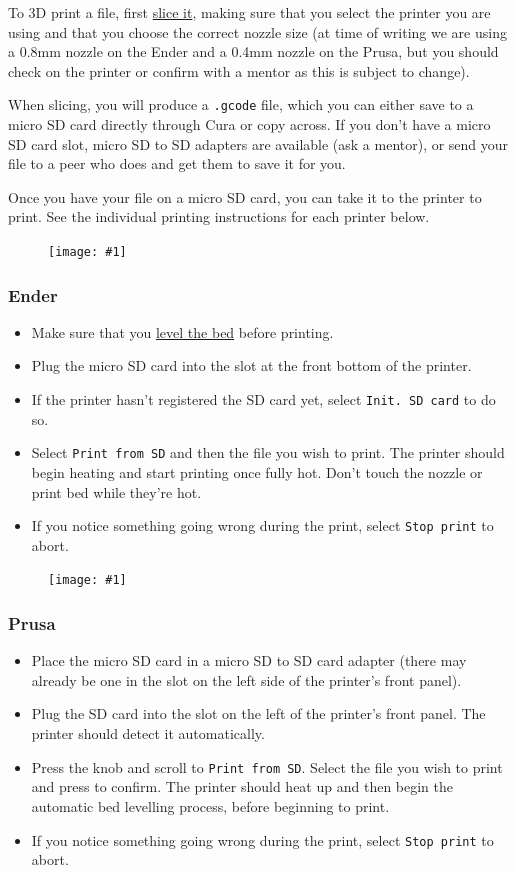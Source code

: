 \documentclass[12pt]{report}
\newcommand{\imageright}[2]{
    \begin{figure}
        \centering
        \texttt{[image: \#1]}
        \vspace*{-1cm}
    \end{figure}
}
\begin{document}
To 3D print a file, first \hyperref[sec:slicing]{slice it}, making sure that you
select the printer you are using and that you choose the correct nozzle size (at
time of writing we are using a 0.8mm nozzle on the Ender and a 0.4mm nozzle on
the Prusa, but you should check on the printer or confirm with a mentor as this
is subject to change). \par
When slicing, you will produce a \texttt{.gcode} file, which you can either save
to a micro SD card directly through Cura or copy across. If you don't have a
micro SD card slot, micro SD to SD adapters are available (ask a mentor), or
send your file to a peer who does and get them to save it for you. \par
Once you have your file on a micro SD card, you can take it to the printer to
print. See the individual printing instructions for each printer below. 

\imageright{ender.jpg}{.25}
\subsubsection*{Ender}

\begin{itemize}
    \item Make sure that you \hyperref[sec:levelling]{level the bed} before
        printing.
    \item Plug the micro SD card into the slot at the front bottom of the
        printer.
    \item If the printer hasn't registered the SD card yet, select
        \texttt{Init. SD card} to do so.
    \item Select \texttt{Print from SD} and then the file you wish to
        print. The printer should begin heating and start printing once fully
        hot. Don't touch the nozzle or print bed while they're hot.
    \item If you notice something going wrong during the print, select
        \texttt{Stop print} to abort.
\end{itemize}

\imageright{prusa.jpg}{.25}
\subsubsection*{Prusa}

\begin{itemize}
    \item Place the micro SD card in a micro SD to SD card adapter (there may
        already be one in the slot on the left side of the printer's front
        panel).
    \item Plug the SD card into the slot on the left of the printer's front
        panel. The printer should detect it automatically.
    \item Press the knob and scroll to \texttt{Print from SD}. Select the file
        you wish to print and press to confirm. The printer should heat up and
        then begin the automatic bed levelling process, before beginning to
        print.
    \item If you notice something going wrong during the print, select
        \texttt{Stop print} to abort.
\end{itemize}
\end{document}
